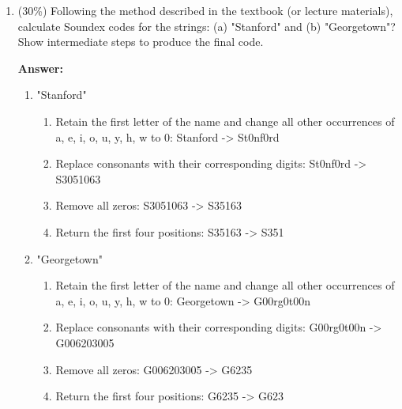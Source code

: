 \documentclass[11pt]{article}
\begin{document}
\begin{enumerate}
\begin{enumerate}
        \end{enumerate}

        \item (30\%) Following the method described in the textbook (or lecture materials), calculate Soundex codes for the strings: (a) "Stanford" and (b) "Georgetown"? Show intermediate steps to produce the final code.

        \textbf{Answer:}
        \begin{enumerate}
            \item "Stanford"
            \begin{enumerate}
                \item Retain the first letter of the name and change all other occurrences of a, e, i, o, u, y, h, w to 0: Stanford -> St0nf0rd
                \item Replace consonants with their corresponding digits: St0nf0rd -> S3051063
                \item Remove all zeros: S3051063 -> S35163
                \item Return the first four positions: S35163 -> S351
            \end{enumerate}

            \item "Georgetown"
            \begin{enumerate}
                \item Retain the first letter of the name and change all other occurrences of a, e, i, o, u, y, h, w to 0: Georgetown -> G00rg0t00n
                \item Replace consonants with their corresponding digits: G00rg0t00n -> G006203005
                \item Remove all zeros: G006203005 -> G6235
                \item Return the first four positions: G6235 -> G623
            \end{enumerate}
        \end{enumerate}

    \end{enumerate}
\end{document}
